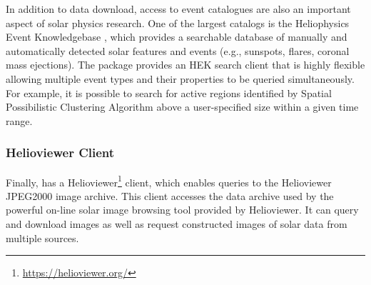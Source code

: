 In addition to data download, access to event catalogues are also an important aspect of solar physics research.
One of the largest catalogs is the Heliophysics Event Knowledgebase \citep[HEK,][]{hek}, which provides a searchable database of manually and automatically detected solar features and events (e.g., sunspots, flares, coronal mass ejections). The \sunpypkg package provides an HEK search client that is highly flexible allowing multiple event types and their properties to be queried simultaneously.
For example, it is possible to search for active regions identified by Spatial Possibilistic Clustering Algorithm \citep[SPoCA,][]{2014AA...561A..29V} above a user-specified size within a given time range.

\subsubsection{Helioviewer Client}
\label{sec:helioviewer}

Finally,  has a Helioviewer\footnote{\url{https://helioviewer.org/}} client, which enables queries to the Helioviewer JPEG2000 image archive.
This client accesses the data archive used by the powerful on-line solar image browsing tool provided by Helioviewer.
It can query and download images as well as request constructed images of solar data from multiple sources.
